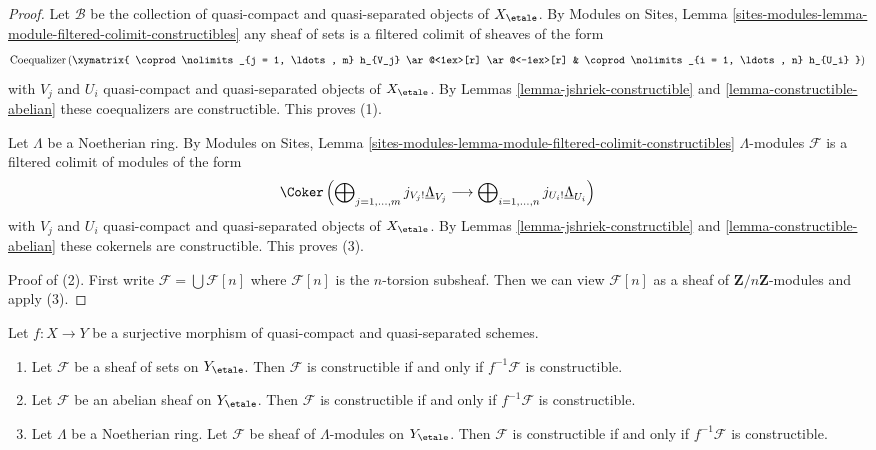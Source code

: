 \begin{proof}
Let $\mathcal{B}$ be the collection of quasi-compact and quasi-separated
objects of $X_\etale$. By Modules on Sites,
Lemma \ref{sites-modules-lemma-module-filtered-colimit-constructibles}
any sheaf of sets is a filtered colimit of sheaves of the form
$$
\text{Coequalizer}\left(
\xymatrix{
\coprod\nolimits_{j = 1, \ldots, m} h_{V_j}
\ar@<1ex>[r] \ar@<-1ex>[r] &
\coprod\nolimits_{i = 1, \ldots, n} h_{U_i}
}
\right)
$$
with $V_j$ and $U_i$ quasi-compact and quasi-separated objects
of $X_\etale$. By
Lemmas \ref{lemma-jshriek-constructible} and \ref{lemma-constructible-abelian}
these coequalizers are constructible. This proves (1).

\medskip\noindent
Let $\Lambda$ be a Noetherian ring.
By Modules on Sites,
Lemma \ref{sites-modules-lemma-module-filtered-colimit-constructibles}
$\Lambda$-modules $\mathcal{F}$ is a filtered colimit
of modules of the form
$$
\Coker\left(
\bigoplus\nolimits_{j = 1, \ldots, m} j_{V_j!}\underline{\Lambda}_{V_j}
\longrightarrow
\bigoplus\nolimits_{i = 1, \ldots, n} j_{U_i!}\underline{\Lambda}_{U_i}
\right)
$$
with $V_j$ and $U_i$ quasi-compact and quasi-separated objects
of $X_\etale$. By
Lemmas \ref{lemma-jshriek-constructible} and \ref{lemma-constructible-abelian}
these cokernels are constructible. This proves (3).

\medskip\noindent
Proof of (2). First write $\mathcal{F} = \bigcup \mathcal{F}[n]$ where
$\mathcal{F}[n]$ is the $n$-torsion subsheaf. Then we can view
$\mathcal{F}[n]$ as a sheaf of $\mathbf{Z}/n\mathbf{Z}$-modules
and apply (3).
\end{proof}

\begin{lemma}
\label{lemma-check-constructible}
Let $f : X \to Y$ be a surjective morphism of quasi-compact and
quasi-separated schemes.
\begin{enumerate}
\item Let $\mathcal{F}$ be a sheaf of sets on $Y_\etale$. Then $\mathcal{F}$
is constructible if and only if $f^{-1}\mathcal{F}$ is constructible.
\item Let $\mathcal{F}$ be an abelian sheaf on $Y_\etale$. Then $\mathcal{F}$
is constructible if and only if $f^{-1}\mathcal{F}$ is constructible.
\item Let $\Lambda$ be a Noetherian ring.
Let $\mathcal{F}$ be sheaf of $\Lambda$-modules on $Y_\etale$.
Then $\mathcal{F}$ is constructible if and only if $f^{-1}\mathcal{F}$
is constructible.
\end{enumerate}
\end{lemma}

